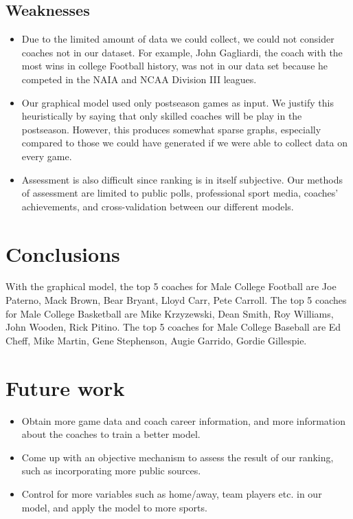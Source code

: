 \documentclass[titlepage,11pt]{article}
\begin{document}
\subsection{Weaknesses}
\begin{itemize}
\item Due to the limited amount of data we could collect, we could not consider coaches not in our dataset. For example, John Gagliardi, the coach with the most wins in college Football history, was not in our data set because he competed in the NAIA and NCAA Division III leagues. 

\item Our graphical model used only postseason games as input. We justify this heuristically by saying that only skilled coaches will be play in the postseason. However, this produces somewhat sparse graphs, especially compared to those we could have generated if we were able to collect data on every game.

\item Assessment is also difficult since ranking is in itself subjective. Our methods of assessment are limited to public polls, professional sport media, coaches' achievements, and cross-validation between our different models.

\end{itemize}

\section{Conclusions}
With the graphical model, the top 5 coaches for Male College Football are Joe Paterno, Mack Brown, Bear Bryant, Lloyd Carr, Pete Carroll. The top 5 coaches for Male College Basketball are Mike Krzyzewski, Dean Smith, Roy Williams, John Wooden, Rick Pitino. The top 5 coaches for Male College Baseball are Ed Cheff, Mike Martin, Gene Stephenson, Augie Garrido, Gordie Gillespie.

\section{Future work}
\begin{itemize}
\item Obtain more game data and coach career information, and more information about the coaches to train a better model.

\item Come up with an objective mechanism to assess the result of our ranking, such as incorporating more public sources.

\item Control for more variables such as home/away, team players etc. in our model, and apply the model to more sports.
\end{itemize}
\end{document}
